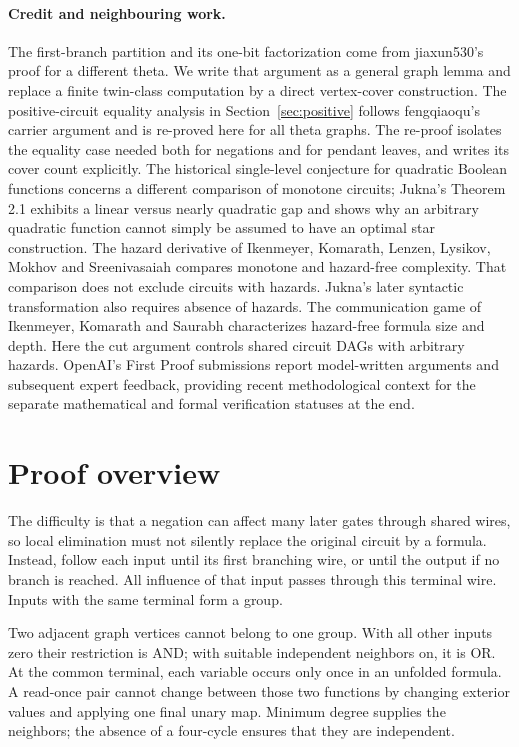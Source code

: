 \documentclass[11pt]{article}
\theoremstyle{definition}
\theoremstyle{remark}
\begin{document}
\paragraph{Credit and neighbouring work.}
The first-branch partition and its one-bit factorization come from
jiaxun530's proof for a different theta\cite{branch}. We write that argument
as a general graph lemma and replace a finite twin-class computation by a
direct vertex-cover construction. The positive-circuit equality analysis
in Section~\ref{sec:positive} follows fengqiaoqu's carrier argument\cite{mono}
and is re-proved here for all theta graphs. The re-proof isolates the
equality case needed both for negations and for pendant leaves, and
writes its cover count explicitly. The historical single-level conjecture
for quadratic Boolean functions concerns a different comparison of monotone
circuits; Jukna's Theorem 2.1\cite{jukna-single} exhibits a linear versus
nearly quadratic gap and shows why an arbitrary
quadratic function cannot simply be assumed to have an optimal star
construction. The hazard derivative of Ikenmeyer, Komarath, Lenzen, Lysikov,
Mokhov and Sreenivasaiah\cite{hazard} compares monotone and hazard-free
complexity. That comparison does not exclude circuits with hazards.
Jukna's later syntactic transformation\cite[Theorem 1]{jukna-hazard}
also requires absence of hazards. The communication game of Ikenmeyer,
Komarath and Saurabh\cite[Theorem 4.6]{hazard-games} characterizes hazard-free
formula size and depth. Here the cut argument controls shared circuit DAGs
with arbitrary hazards.
OpenAI's First Proof submissions\cite{openai} report model-written arguments
and subsequent expert feedback, providing recent methodological context for
the separate mathematical and formal verification statuses at the end.

\section{Proof overview}

The difficulty is that a negation can affect many later gates through shared
wires, so local elimination must not silently replace the original circuit
by a formula. Instead, follow each input until its first branching wire,
or until the output if no branch is reached. All influence of that input
passes through this terminal wire. Inputs with the same terminal form a
group.

Two adjacent graph vertices cannot belong to one group. With all other
inputs zero their restriction is AND; with suitable independent neighbors
on, it is OR. At the common terminal, each variable occurs only once in
an unfolded formula. A read-once pair cannot change between those two
functions by changing exterior values and applying one final unary map.
Minimum degree supplies the neighbors; the absence of a four-cycle ensures
that they are independent.
\end{document}
